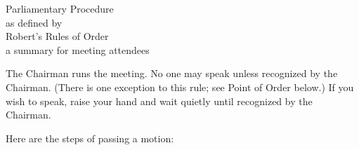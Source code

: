 %
\oddsidemargin 0pt
\textwidth 6.5in
\pagestyle{empty}

\begin{centering}
{\Large
Parliamentary Procedure \\
{\normalsize as defined by}\\
Robert's Rules of Order \\
{\normalsize a summary for meeting attendees}\\[3ex]
}
\end{centering}

The Chairman runs the meeting.  No one may speak unless recognized by
the Chairman.  (There is one exception to this rule; see Point of
Order below.)  If you wish to speak, raise your hand and wait quietly
until recognized by the Chairman.

\bigskip
Here are the steps of passing a motion:

